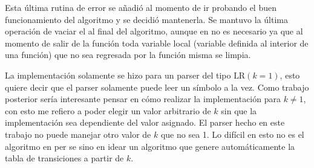 Esta última rutina de error se añadió al momento de ir probando el buen funcionamiento del algoritmo y se decidió mantenerla. Se mantuvo la última operación de vaciar el  al final del algoritmo, aunque en  no es necesario ya que al momento de salir de la función  toda variable local (variable definida al interior de una función) que no sea regresada por la función misma se limpia.

La implementación solamente se hizo para un parser del tipo $\text{LR}(k=1)$, esto quiere decir que el parser solamente puede leer un símbolo a la vez. Como trabajo posterior sería interesante pensar en cómo realizar la implementación para $k \neq 1$, con esto me refiero a poder elegir un valor arbitrario de $k$ sin que la implementación sea dependiente del valor asignado. El parser hecho en este trabajo no puede manejar otro valor de $k$ que no sea 1. Lo difícil en esto no es el algoritmo en  per se sino en idear un algoritmo que genere automáticamente la tabla de transiciones a partir de $k$.

